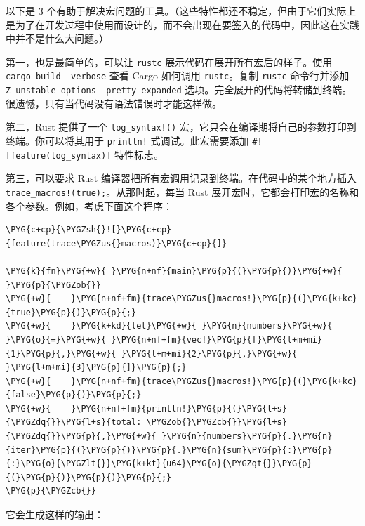 以下是 3 个有助于解决宏问题的工具。（这些特性都还不稳定，但由于它们实际上是为了在开发过程中使用而设计的，而不会出现在要签入的代码中，因此这在实践中并不是什么大问题。）

第一，也是最简单的，可以让 \texttt{rustc} 展示代码在展开所有宏后的样子。使用 \texttt{cargo build --verbose} 查看 Cargo 如何调用 \texttt{rustc}。复制 \texttt{rustc} 命令行并添加 \texttt{-Z unstable-options --pretty expanded} 选项。完全展开的代码将转储到终端。很遗憾，只有当代码没有语法错误时才能这样做。

第二，Rust 提供了一个 \texttt{log\_syntax!()} 宏，它只会在编译期将自己的参数打印到终端。你可以将其用于 \texttt{println!} 式调试。此宏需要添加 \texttt{\#![feature(log\_syntax)]} 特性标志。

第三，可以要求 Rust 编译器把所有宏调用记录到终端。在代码中的某个地方插入 \texttt{trace\_macros!(true);}。从那时起，每当 Rust 展开宏时，它都会打印宏的名称和各个参数。例如，考虑下面这个程序：

\begin{Verbatim}[commandchars=\\\{\},breaklines=true,breakanywhere=true,fontsize=\codefont,xleftmargin=17bp]
\PYG{c+cp}{\PYGZsh{}![}\PYG{c+cp}{feature(trace\PYGZus{}macros)}\PYG{c+cp}{]}

\PYG{k}{fn}\PYG{+w}{ }\PYG{n+nf}{main}\PYG{p}{(}\PYG{p}{)}\PYG{+w}{ }\PYG{p}{\PYGZob{}}
\PYG{+w}{    }\PYG{n+nf+fm}{trace\PYGZus{}macros!}\PYG{p}{(}\PYG{k+kc}{true}\PYG{p}{)}\PYG{p}{;}
\PYG{+w}{    }\PYG{k+kd}{let}\PYG{+w}{ }\PYG{n}{numbers}\PYG{+w}{ }\PYG{o}{=}\PYG{+w}{ }\PYG{n+nf+fm}{vec!}\PYG{p}{[}\PYG{l+m+mi}{1}\PYG{p}{,}\PYG{+w}{ }\PYG{l+m+mi}{2}\PYG{p}{,}\PYG{+w}{ }\PYG{l+m+mi}{3}\PYG{p}{]}\PYG{p}{;}
\PYG{+w}{    }\PYG{n+nf+fm}{trace\PYGZus{}macros!}\PYG{p}{(}\PYG{k+kc}{false}\PYG{p}{)}\PYG{p}{;}
\PYG{+w}{    }\PYG{n+nf+fm}{println!}\PYG{p}{(}\PYG{l+s}{\PYGZdq{}}\PYG{l+s}{total: \PYGZob{}\PYGZcb{}}\PYG{l+s}{\PYGZdq{}}\PYG{p}{,}\PYG{+w}{ }\PYG{n}{numbers}\PYG{p}{.}\PYG{n}{iter}\PYG{p}{(}\PYG{p}{)}\PYG{p}{.}\PYG{n}{sum}\PYG{p}{:}\PYG{p}{:}\PYG{o}{\PYGZlt{}}\PYG{k+kt}{u64}\PYG{o}{\PYGZgt{}}\PYG{p}{(}\PYG{p}{)}\PYG{p}{)}\PYG{p}{;}
\PYG{p}{\PYGZcb{}}
\end{Verbatim}

它会生成这样的输出：

